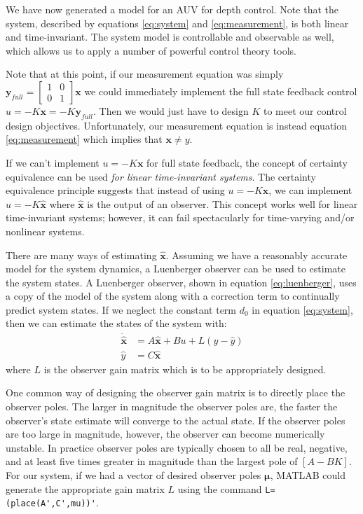 \documentclass{article}
\begin{document}
We have now generated a model for an AUV for depth control.  Note that the system, described by equations \ref{eq:system} and \ref{eq:measurement}, is both linear and time-invariant.  The system model is controllable and observable as well, which allows us to apply a number of powerful control theory tools.

Note that at this point, if our measurement equation was simply $\pmb{y}_{full}=\begin{bmatrix} 1 & 0 \\ 0 & 1 \end{bmatrix} \pmb{x}$ we could immediately implement the full state feedback control $u=-K\pmb{x}=-K\pmb{y}_{full}$.  Then we would just have to design $K$ to meet our control design objectives.  Unfortunately, our measurement equation is instead equation \ref{eq:measurement} which implies that $\pmb{x}\neq y$.

If we can't implement $u=-K\pmb{x}$ for full state feedback, the concept of certainty equivalence can be used \emph{for linear time-invariant systems}.  The certainty equivalence principle suggests that instead of using $u=-K\pmb{x}$, we can implement $u=-K\pmb{\hat{x}}$ where $\pmb{\hat{x}}$ is the output of an observer.  This concept works well for linear time-invariant systems; however, it can fail spectacularly for time-varying and/or nonlinear systems.

There are many ways of estimating $\pmb{\hat{x}}$.  Assuming we have a reasonably accurate model for the system dynamics, a Luenberger observer can be used to estimate the system states.  A Luenberger observer, shown in equation \ref{eq:luenberger}, uses a copy of the model of the system along with a correction term to continually predict system states.  If we neglect the constant term $d_0$ in equation \ref{eq:system}, then we can estimate the states of the system with:
\begin{equation}
\begin{split}
\label{eq:luenberger}
\pmb{\dot{\hat{x}}}&=A\pmb{\hat{x}}+Bu+L(y-\hat{y}) \\
\hat{y}&=C\pmb{\hat{x}}
\end{split}
\end{equation}
where $L$ is the observer gain matrix which is to be appropriately designed.  

One common way of designing the observer gain matrix is to directly place the observer poles. The larger in magnitude the observer poles are, the faster the observer's state estimate will converge to the actual state.  If the observer poles are too large in magnitude, however, the observer can become numerically unstable.  In practice observer poles are typically chosen to all be real, negative, and at least five times greater in magnitude than the largest pole of $[A-BK]$.  For our system, if we had a vector of desired observer poles $\pmb{\mu}$, MATLAB could generate the appropriate gain matrix $L$ using the command \verb+L=(place(A',C',mu))'+.
\end{document}
